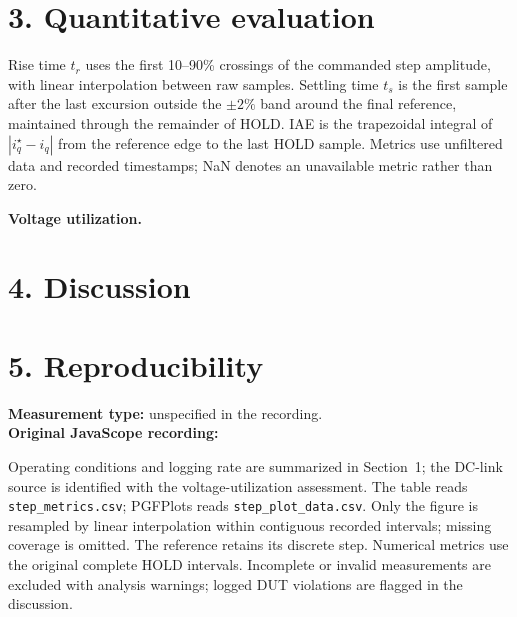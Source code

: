 \documentclass[a4paper,11pt]{article}
\begin{document}
\section*{3. Quantitative evaluation}
\begin{center}
\end{center}

Rise time $t_r$ uses the first 10--90\% crossings of the commanded step amplitude,
with linear interpolation between raw samples. Settling time $t_s$ is the first
sample after the last excursion outside the $\pm2\%$ band around the final
reference, maintained through the remainder of HOLD. IAE is the trapezoidal
integral of $|i_q^\star-i_q|$ from the reference edge to the last HOLD sample.
Metrics use unfiltered data and recorded timestamps; NaN denotes an unavailable
metric rather than zero.

\smallskip
\textbf{Voltage utilization.}

\section*{4. Discussion}

\section*{5. Reproducibility}
\textbf{Measurement type:} unspecified in the recording.\\
\textbf{Original JavaScope recording:}

Operating conditions and logging rate are summarized in Section~1; the DC-link
source is identified with the voltage-utilization assessment. The table reads
\texttt{step\_metrics.csv}; PGFPlots reads \texttt{step\_plot\_data.csv}.
Only the figure is resampled by linear interpolation within contiguous recorded
intervals; missing coverage is omitted. The reference retains its discrete step.
Numerical metrics use the original complete HOLD intervals. Incomplete or invalid
measurements are excluded with analysis warnings; logged DUT violations are
flagged in the discussion.
\fi
\end{document}
